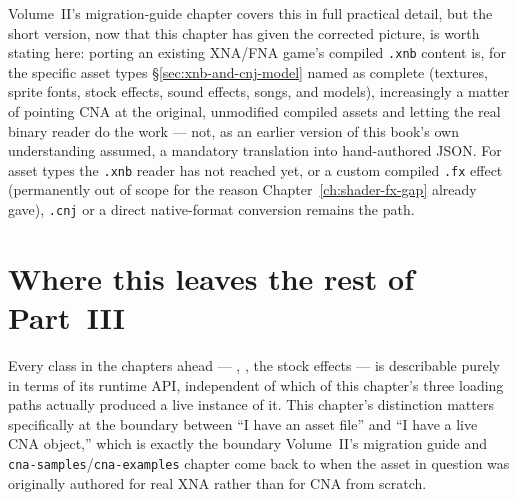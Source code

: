 Volume~II's migration-guide chapter covers this in full practical detail, but the
short version, now that this chapter has given the corrected picture, is worth stating here:
porting an existing XNA/FNA game's compiled \texttt{.xnb} content is, for the specific asset
types \S\ref{sec:xnb-and-cnj-model} named as complete (textures, sprite fonts, stock effects,
sound effects, songs, and models), increasingly a matter of pointing CNA at the original,
unmodified compiled assets and letting the real binary reader do the work --- not, as an
earlier version of this book's own understanding assumed, a mandatory translation into
hand-authored JSON. For asset types the \texttt{.xnb} reader has not reached yet, or a custom
compiled \texttt{.fx} effect (permanently out of scope for the reason
Chapter~\ref{ch:shader-fx-gap} already gave), \texttt{.cnj} or a direct native-format
conversion remains the path.

\section{Where this leaves the rest of Part~III}

Every class in the chapters ahead --- , , the stock
effects --- is describable purely in terms of its runtime API, independent of which of this
chapter's three loading paths actually produced a live instance of it. This chapter's
distinction matters specifically at the boundary between ``I have an asset file'' and ``I have
a live CNA object,'' which is exactly the boundary Volume~II's migration guide and
\texttt{cna-samples}/\texttt{cna-examples} chapter come back to when the asset in question was
originally authored for real XNA rather than for CNA from scratch.
